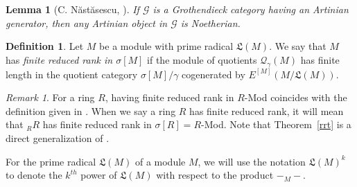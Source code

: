 \documentclass{amsart}
\newtheorem{lemma}[thm]{Lemma}
\theoremstyle{definition}
\newtheorem{defn}[thm]{Definition}
\theoremstyle{remark}
\newtheorem{rem}[thm]{Remark}
\numberwithin{equation}{section}
\DeclareMathOperator{\Sat}{Sat}
\newcommand{\sm}{\sigma[M]}
\begin{document}
	
	
	\begin{lemma}[C. N\u{a}st\u{a}sescu, {\cite[Corollarie 2]{nuastuasescu1980theoreme}}]\label{Nas}
		If $\mathcal{G}$ is a Grothendieck category having an Artinian generator, 
		then any Artinian object in $\mathcal{G}$ is Noetherian.
	\end{lemma}
	
	\begin{defn}
		Let $M$ be a module with prime radical $\mathfrak{L}(M)$. 
		We say that $M$ has \emph{finite reduced rank in $\sm$} 
		if the module of quotients $\mathcal{Q}_\gamma(M)$ 
		has finite length in the quotient category $\sm/\gamma$ cogenerated by $E^{[M]}(M/\mathfrak{L}(M))$.
	\end{defn}
	
	\begin{rem}
		For a ring $R$, 
		having finite reduced rank in $R$-Mod 
		coincides with the definition given in \cite{beachy1982rings}. 
		When we say a ring $R$ has finite reduced rank, 
		it will mean that $_RR$ has finite reduced rank in $\sigma[R]=R$-Mod.
		Note that Theorem~\ref{rrt} is a direct generalization of
		\cite[Theorem~1]{beachy1982rings}.
	\end{rem}
	
	For the prime radical $\mathfrak{L}(M)$ of a module $M$,
	we will use the notation $\mathfrak{L}(M)^k$ 
	to denote the $k^{th}$ power of $\mathfrak{L}(M)$ 
	with respect to the product $-_M-$.
	
\end{document}
